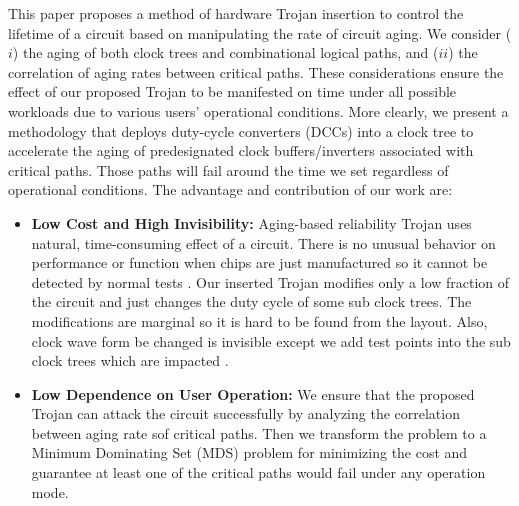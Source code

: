 This paper proposes a method of hardware Trojan insertion to control the lifetime of a circuit based on manipulating the rate of circuit aging. We consider ($i$) the aging of both clock trees and combinational logical paths, and ($ii$) the correlation of aging rates between critical paths. These considerations ensure the effect of our proposed Trojan to be manifested on time under all possible workloads due to various users' operational conditions. More clearly, we present a methodology that deploys duty-cycle converters (DCCs) into a clock tree to accelerate the aging of predesignated clock buffers/inverters associated with critical paths. Those paths will fail around the time we set regardless of operational conditions. The advantage and contribution of our work are:
\begin{itemize}
	\item \textbf{Low Cost and High Invisibility:} Aging-based reliability Trojan uses natural, time-consuming effect of a circuit. There is no unusual behavior on performance or function when chips are just manufactured so it cannot be detected by normal tests \cite{sreedhar2012reliability}. Our inserted Trojan modifies only a low fraction of the circuit and just changes the duty cycle of some sub clock trees. The modifications are marginal so it is hard to be found from the layout. Also, clock wave form be changed is invisible except we add test points into the sub clock trees which are impacted \cite{sreedhar2012reliability}.
	\item \textbf{Low Dependence on User Operation:} We ensure that the proposed Trojan can attack the circuit successfully by analyzing the correlation between aging rate sof critical paths. Then we transform the problem to a Minimum Dominating Set (MDS) problem for minimizing the cost and guarantee at least one of the critical paths would fail under any operation mode.
\end{itemize}

